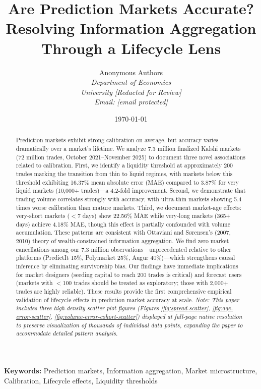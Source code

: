 \documentclass[12pt,letterpaper]{article}
\title{\textbf{Are Prediction Markets Accurate? Resolving Information Aggregation Through a Lifecycle Lens}}
\author{
    Anonymous Authors\\
    \small \textit{Department of Economics}\\
    \small \textit{University [Redacted for Review]}\\
    \small \textit{Email: [email protected]}
}
\date{\today}
\begin{document}
\maketitle

\begin{abstract}
\noindent Prediction markets exhibit strong calibration on average, but accuracy varies dramatically over a market's lifetime. We analyze 7.3 million finalized Kalshi markets (72 million trades, October 2021--November 2025) to document three novel associations related to calibration. First, we identify a liquidity threshold at approximately 200 trades marking the transition from thin to liquid regimes, with markets below this threshold exhibiting 16.37\% mean absolute error (MAE) compared to 3.87\% for very liquid markets (10,000+ trades)---a 4.2-fold improvement. Second, we demonstrate that trading volume correlates strongly with accuracy, with ultra-thin markets showing 5.4 times worse calibration than mature markets. Third, we document market-age effects: very-short markets ($<$7 days) show 22.56\% MAE while very-long markets (365+ days) achieve 4.18\% MAE, though this effect is partially confounded with volume accumulation. These patterns are consistent with Ottaviani and S{\o}rensen's (2007, 2010) theory of wealth-constrained information aggregation. We find zero market cancellations among our 7.3 million observations---unprecedented relative to other platforms (PredictIt 15\%, Polymarket 25\%, Augur 40\%)---which strengthens causal inference by eliminating survivorship bias. Our findings have immediate implications for market designers (seeding capital to reach 200 trades is critical) and forecast users (markets with $<$100 trades should be treated as exploratory; those with 2,000+ trades are highly reliable). These results provide the first comprehensive empirical validation of lifecycle effects in prediction market accuracy at scale. \textit{Note: This paper includes three high-density scatter plot figures (Figures \ref{fig:spread-scatter}, \ref{fig:age-error-scatter}, \ref{fig:volume-error-cohort-scatter}) displayed at full-page native resolution to preserve visualization of thousands of individual data points, expanding the paper to accommodate detailed pattern analysis.}
\end{abstract}

\vspace{0.3cm}
\noindent \textbf{Keywords:} Prediction markets, Information aggregation, Market microstructure, Calibration, Lifecycle effects, Liquidity thresholds
\end{document}
